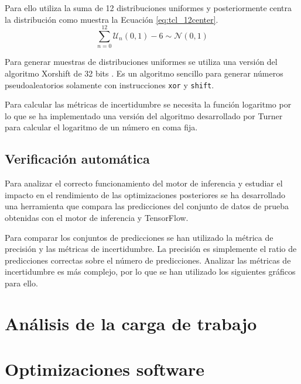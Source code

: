 Para ello utiliza la suma de 12 distribuciones uniformes y posteriormente centra la distribución como muestra la Ecuación \ref{eq:tcl_12center}.
\begin{equation} \label{eq:tcl_12center}
\sum_{n=0}^{12} \mathcal{U}_n(0,1) - 6 \sim \mathcal{N}(0,1)
\end{equation}

Para generar muestras de distribuciones uniformes se utiliza una versión del algoritmo Xorshift de 32 bits \cite{xorshift}. Es un algoritmo sencillo para generar números pseudoaleatorios solamente con instrucciones \texttt{xor} y \texttt{shift}.

Para calcular las métricas de incertidumbre se necesita la función logaritmo por lo que se ha implementado una versión del algoritmo desarrollado por Turner \cite{binary_log} para calcular el logaritmo de un número en coma fija. 

\subsection{Verificación automática}

Para analizar el correcto funcionamiento del motor de inferencia y estudiar el impacto en el rendimiento de las optimizaciones posteriores se ha desarrollado una herramienta que compara las predicciones del conjunto de datos de prueba obtenidas con el motor de inferencia y TensorFlow.

Para comparar los conjuntos de predicciones se han utilizado la métrica de precisión y las métricas de incertidumbre. La precisión es simplemente el ratio de predicciones correctas sobre el número de predicciones. Analizar las métricas de incertidumbre es más complejo, por lo que se han utilizado los siguientes gráficos para ello.\\




\section{Análisis de la carga de trabajo}



\section{Optimizaciones software}

